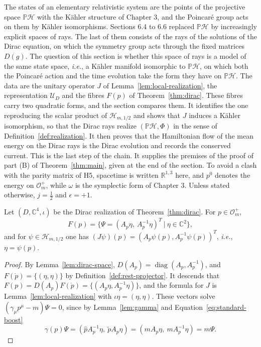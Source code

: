 The states of an elementary relativistic system are the points of the projective space $\mathbb{P}\mathcal{H}$ with the Kähler structure of Chapter 3, and the Poincar\'e group acts on them by Kähler isomorphisms. Sections 6.4 to 6.6 replaced $\mathbb{P}\mathcal{H}$ by increasingly explicit spaces of rays. The last of them consists of the rays of the solutions of the Dirac equation, on which the symmetry group acts through the fixed matrices $D(g)$. The question of this section is whether this space of rays is a model of the same state space, \textit{i.e.}, a Kähler manifold isomorphic to $\mathbb{P}\mathcal{H}$, on which both the Poincar\'e action and the time evolution take the form they have on $\mathbb{P}\mathcal{H}$. The data are the unitary operator $J$ of Lemma~\ref{lem:local-realization}, the representation $\mathcal{U}_D$ and the fibres $F(p)$ of Theorem~\ref{thm:dirac}. These fibres carry two quadratic forms, and the section compares them. It identifies the one reproducing the scalar product of $\mathcal{H}_{m,1/2}$ and shows that $J$ induces a Kähler isomorphism, so that the Dirac rays realize $(\mathbb{P}\mathcal{H},\Phi)$ in the sense of Definition~\ref{def:realization}. It then proves that the Hamiltonian flow of the mean energy on the Dirac rays is the Dirac evolution and records the conserved current. This is the last step of the chain. It supplies the premises of the proof of part (B) of Theorem~\ref{thm:main}, given at the end of the section. To avoid a clash with the parity matrix of H5, spacetime is written $\mathbb{R}^{1,3}$ here, and $p^0$ denotes the energy on $\mathcal{O}_m^+$, while $\omega$ is the symplectic form of Chapter 3. Unless stated otherwise, $j=\tfrac12$ and $\epsilon=+1$.

\begin{proposition}\label{prop:explicit-solutions}
	Let $(D,\mathbb{C}^4,\iota)$ be the Dirac realization of Theorem~\ref{thm:dirac}. For $p\in\mathcal{O}_m^+$,
	\begin{equation*}
		F(p)=\big\{\Psi=(A_p\eta,\ A_p^{-1}\eta)^T\ \big|\ \eta\in\mathbb{C}^2\big\},
	\end{equation*}
	and for $\psi\in\mathcal{H}_{m,1/2}$ one has $(J\psi)(p)=(A_p\psi(p),A_p^{-1}\psi(p))^T$, \textit{i.e.}, $\eta=\psi(p)$.
\end{proposition}

\begin{proof}
	By Lemma~\ref{lem:dirac-space}, $D(A_p)=\operatorname{diag}(A_p,A_p^{-1})$, and $F(\mathring{p})=\{(\eta,\eta)\}$ by Definition~\ref{def:rest-projector}. It descends that $F(p)=D(A_p)F(\mathring{p})=\{(A_p\eta,A_p^{-1}\eta)\}$, and the formula for $J$ is Lemma~\ref{lem:local-realization} with $\iota\eta=(\eta,\eta)$. These vectors solve $(\gamma_\mu p^\mu-m)\Psi=0$, since by Lemma~\ref{lem:gamma} and Equation~\eqref{eq:standard-boost}
	\begin{equation*}
		\gamma(p)\Psi=(\hat{p}A_p^{-1}\eta,\ \tilde{p}A_p\eta)=(mA_p\eta,\ mA_p^{-1}\eta)=m\Psi.
	\end{equation*}
\end{proof}

